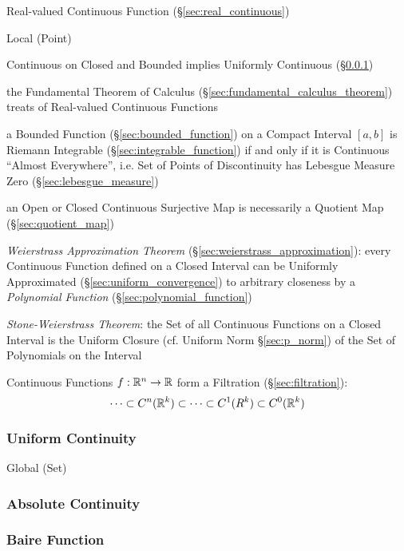 Real-valued Continuous Function (\S\ref{sec:real_continuous})

Local (Point)

Continuous on Closed and Bounded implies Uniformly Continuous
(\S\ref{sec:uniform_continuity})

the Fundamental Theorem of Calculus (\S\ref{sec:fundamental_calculus_theorem})
treats of Real-valued Continuous Functions

a Bounded Function (\S\ref{sec:bounded_function}) on a Compact Interval $[a,b]$
is Riemann Integrable (\S\ref{sec:integrable_function}) if and only if it is
Continuous ``Almost Everywhere'', i.e. Set of Points of Discontinuity has
Lebesgue Measure Zero (\S\ref{sec:lebesgue_measure})

an Open or Closed Continuous Surjective Map is necessarily a Quotient Map
(\S\ref{sec:quotient_map})

\emph{Weierstrass Approximation Theorem}
(\S\ref{sec:weierstrass_approximation}): every Continuous Function defined on a
Closed Interval can be Uniformly Approximated (\S\ref{sec:uniform_convergence})
to arbitrary closeness by a \emph{Polynomial Function}
(\S\ref{sec:polynomial_function})

\emph{Stone-Weierstrass Theorem}: the Set of all Continuous Functions on a
Closed Interval is the Uniform Closure (cf. Uniform Norm \S\ref{sec:p_norm}) of
the Set of Polynomials on the Interval

Continuous Functions $f : \mathbb{R}^n \rightarrow \mathbb{R}$ form a Filtration
(\S\ref{sec:filtration}):
\[
  \cdots \subset C^n(\mathbb{R}^k) \subset \cdots \subset C^1(R^k) \subset
    C^0(\mathbb{R}^k)
\]



\subsubsection{Uniform Continuity}\label{sec:uniform_continuity}

Global (Set)



\subsubsection{Absolute Continuity}\label{sec:absolute_contunuity}

\subsubsection{Baire Function}\label{sec:baire_function}

